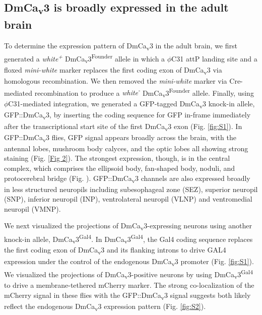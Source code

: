 \subsection*{DmCa\textsubscript{v}3 is broadly expressed in the adult brain}

To determine the expression pattern of DmCa\textsubscript{v}3 in the adult brain, we first generated a \emph{white\textsuperscript{+}} DmCa\textsubscript{v}3\textsuperscript{Founder} allele in which a $\phi$C31 attP landing site and a floxed \emph{mini-white} marker replaces the first coding exon of DmCa\textsubscript{v}3 via homologous recombination\cite{Huang:2009ei}.
We then removed the \emph{mini-white} marker via Cre-mediated recombination to produce a \emph{white\textsuperscript{-}} DmCa\textsubscript{v}3\textsuperscript{Founder} allele.
Finally, using $\phi$C31-mediated integration, we generated a GFP-tagged DmCa\textsubscript{v}3 knock-in allele, GFP::DmCa\textsubscript{v}3, by inserting the coding sequence for GFP in-frame immediately after the transcriptional start site of the first DmCa\textsubscript{v}3 exon (Fig. \ref{fig:S1}).
In GFP::DmCa\textsubscript{v}3 flies, GFP signal appears broadly across the brain, with the antennal lobes, mushroom body calyces, and the optic lobes all showing strong staining (Fig. \ref{Fig 2}).
The strongest expression, though, is in the central complex, which comprises the ellipsoid body, fan-shaped body, noduli, and protocerebral bridge (Fig. ).
GFP::DmCa\textsubscript{v}3 channels are also expressed broadly in less structured neuropils including subesophageal zone (SEZ), superior neuropil (SNP), inferior neuropil (INP), ventrolateral neuropil (VLNP) and ventromedial neuropil (VMNP).

We next visualized the projections of DmCa\textsubscript{v}3-expressing neurons using another knock-in allele, DmCa\textsubscript{v}3\textsuperscript{Gal4}.
In DmCa\textsubscript{v}3\textsuperscript{Gal4}, the Gal4 coding sequence replaces the first coding exon of DmCa\textsubscript{v}3 and its flanking introns to drive GAL4 expression under the control of the endogenous DmCa\textsubscript{v}3 promoter (Fig. \ref{fig:S1}).
We visualized the projections of DmCa\textsubscript{v}3-positive neurons by using DmCa\textsubscript{v}3\textsuperscript{Gal4} to drive a membrane-tethered mCherry marker.
The strong co-localization of the mCherry signal in these flies with the GFP::DmCa\textsubscript{v}3 signal suggests both likely reflect the endogenous DmCa\textsubscript{v}3 expression pattern (Fig. \ref{fig:S2}).
    
    
    
    
    
    